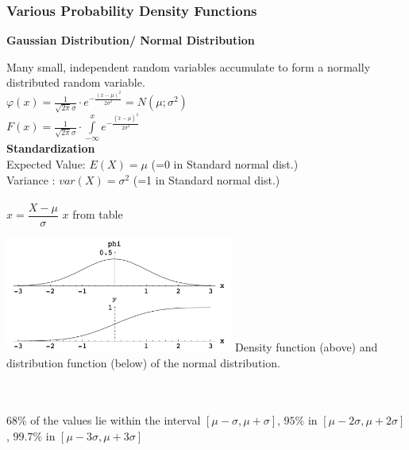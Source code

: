     \subsubsection{Various Probability Density Functions}
        \textbf{Gaussian Distribution/ Normal Distribution}\\
        \begin{minipage}{10cm}
        Many small, independent random variables accumulate to form a
        normally distributed random variable.\\
         $\varphi(x)=\frac{1}{\sqrt{2
        \pi}\sigma}\cdot e^{-\frac{(x-\mu)^2}{2\sigma^2}} = N(\mu ; \sigma^2) $\\
        $F(x)=\frac{1}{\sqrt{2
        \pi}\sigma}\cdot \int\limits^{x}_{-\infty}{e^{-\frac{(\tilde{x} -\mu)^2}{2\sigma^2}}} $ \\
        \textbf{Standardization}\\
        Expected Value: $E(X)=\mu$ \hspace{4mm}(=0 in Standard normal dist.)\\
        Variance \hspace{11.5mm}: $var(X)=\sigma^2$ (=1 in Standard normal dist.)\\ \\
        $x=\dfrac{X-\mu}{\sigma}$ \hspace{5mm} $x$ from table
        \end{minipage}
        \hspace{5mm}
        \begin{minipage}{7.5cm}
        \includegraphics[width=7.5cm]{bilder/normalverteilung.png}
        Density function (above) and distribution function (below) of the normal distribution.
        \end{minipage} \\ \\
        $ 68\% $ of the values lie within the interval $[ \mu - \sigma, \mu + \sigma]$,
        $95\% $ in $[ \mu - 2\sigma, \mu + 2\sigma]$,
        $99.7\% $ in $[ \mu - 3\sigma, \mu + 3\sigma]$\\\\
